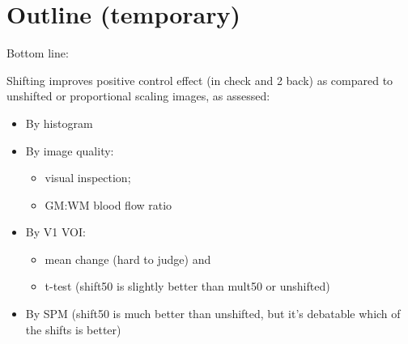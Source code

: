 \section{Outline (temporary)}
Bottom line:

Shifting improves positive control effect (in check and 2 back) as compared to unshifted or proportional scaling images, as assessed:
\begin{itemize}
\item By histogram
\item By image quality: 
  \begin{itemize}
  \item visual inspection;
  \item GM:WM blood flow ratio
  \end{itemize}
\item By V1 VOI: 
  \begin{itemize} 
  \item mean change (hard to judge) and 
  \item t-test (shift50 is slightly better than mult50 or unshifted)
  \end{itemize}
\item By SPM (shift50 is much better than unshifted, but it's debatable which of the shifts is better)
\end{itemize}
